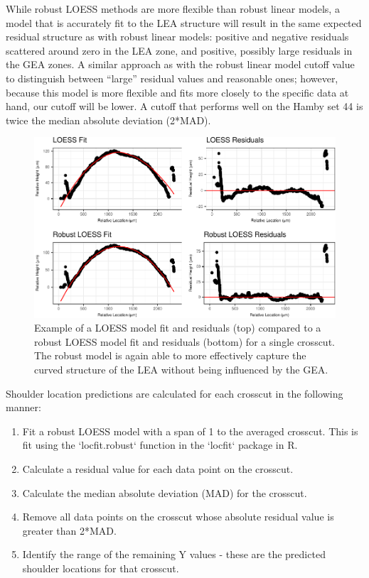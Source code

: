 \documentclass[]{article}
\begin{document}
While robust LOESS methods are more flexible than robust linear models,
a model that is accurately fit to the LEA structure will result in the
same expected residual structure as with robust linear models: positive
and negative residuals scattered around zero in the LEA zone, and
positive, possibly large residuals in the GEA zones. A similar approach
as with the robust linear model cutoff value to distinguish between
``large'' residual values and reasonable ones; however, because this
model is more flexible and fits more closely to the specific data at
hand, our cutoff will be lower. A cutoff that performs well on the Hamby
set 44 is twice the median absolute deviation (2*MAD).

\begin{figure}
\centering
\includegraphics{writeup_files/figure-latex/unnamed-chunk-4-1.pdf}
\caption{Example of a LOESS model fit and residuals (top) compared to a
robust LOESS model fit and residuals (bottom) for a single crosscut. The
robust model is again able to more effectively capture the curved
structure of the LEA without being influenced by the GEA.}
\end{figure}

Shoulder location predictions are calculated for each crosscut in the
following manner:

\begin{enumerate}
\item Fit a robust LOESS model with a span of 1 to the averaged crosscut. This is fit using the `locfit.robust` function in the `locfit` package in R.
\item Calculate a residual value for each data point on the crosscut.  
\item Calculate the median absolute deviation (MAD) for the crosscut.  
\item Remove all data points on the crosscut whose absolute residual value is greater than 2*MAD.  
\item Identify the range of the remaining Y values - these are the predicted shoulder locations for that crosscut.   
\end{enumerate}
\end{document}

